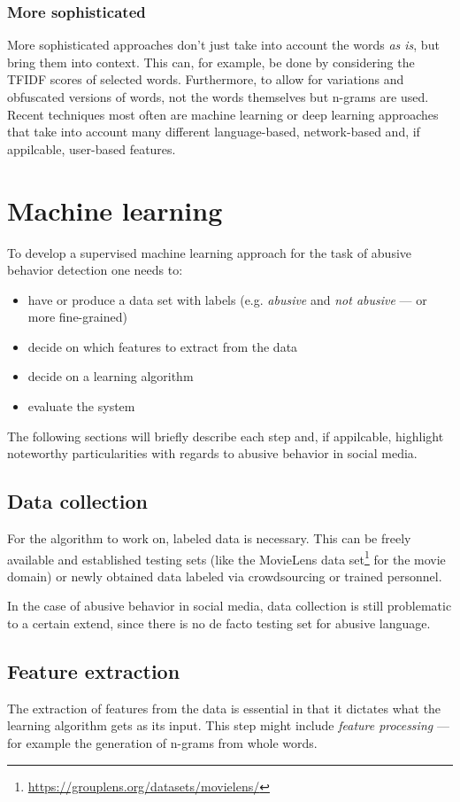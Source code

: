 \documentclass{proseminar}
\begin{document}
\subsubsection{More sophisticated} More sophisticated approaches don't just take into account the words \emph{as is}, but bring them into context. This can, for example, be done by considering the TFIDF scores of selected words. Furthermore, to allow for variations and obfuscated versions of words, not the words themselves but n-grams are used\cite{Yin:2009}. Recent techniques most often are machine learning\cite{Yahoo:2016}\cite{Twitter:2017} or deep learning\cite{DeepLearning:2017} approaches that take into account many different language-based, network-based and, if appilcable, user-based features.

\section{Machine learning}
To develop a supervised machine learning approach for the task of abusive behavior detection one needs to:
\begin{itemize}
\item have or produce a data set with labels (e.g. \emph{abusive} and \emph{not abusive} --- or more fine-grained)
\item decide on which features to extract from the data
\item decide on a learning algorithm
\item evaluate the system
\end{itemize}
The following sections will briefly describe each step and, if appilcable, highlight noteworthy particularities with regards to abusive behavior in social media.

\subsection{Data collection}
For the algorithm to work on, labeled data is necessary. This can be freely available and established testing sets (like the MovieLens data set\footnote{\url{https://grouplens.org/datasets/movielens/}} for the movie domain) or newly obtained data labeled via crowdsourcing or trained personnel.

In the case of abusive behavior in social media, data collection is still problematic to a certain extend, since there is no de facto testing set for abusive language\cite{Yahoo:2016}.

\subsection{Feature extraction}
The extraction of features from the data is essential in that it dictates what the learning algorithm gets as its input. This step might include \emph{feature processing} --- for example the generation of n-grams from whole words.
\end{document}
